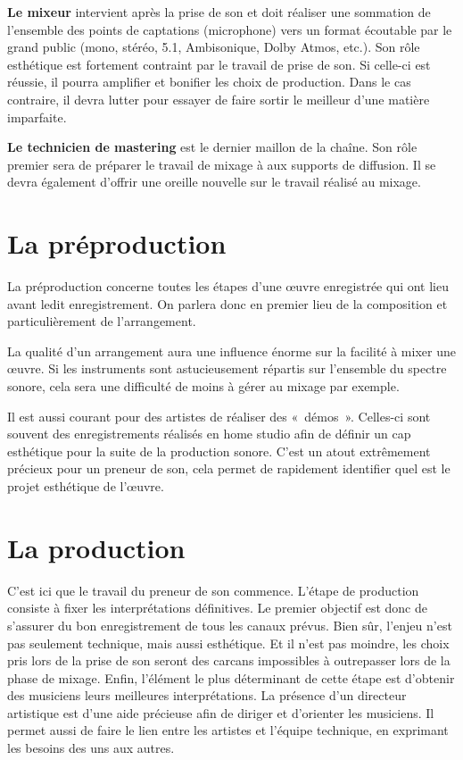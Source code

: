 \documentclass[
]{book}
\begin{document}
\textbf{Le mixeur} intervient après la prise de son et doit réaliser une sommation de l'ensemble des points de captations (microphone) vers un format écoutable par le grand public (mono, stéréo, 5.1, Ambisonique, Dolby Atmos, etc.). Son rôle esthétique est fortement contraint par le travail de prise de son. Si celle-ci est réussie, il pourra amplifier et bonifier les choix de production. Dans le cas contraire, il devra lutter pour essayer de faire sortir le meilleur d'une matière imparfaite.

\textbf{Le technicien de mastering} est le dernier maillon de la chaîne. Son rôle premier sera de préparer le travail de mixage à aux supports de diffusion. Il se devra également d'offrir une oreille nouvelle sur le travail réalisé au mixage.

\hypertarget{la-pruxe9production}{%
\section{La préproduction}\label{la-pruxe9production}}

La préproduction concerne toutes les étapes d'une œuvre enregistrée qui ont lieu avant ledit enregistrement. On parlera donc en premier lieu de la composition et particulièrement de l'arrangement.

La qualité d'un arrangement aura une influence énorme sur la facilité à mixer une œuvre. Si les instruments sont astucieusement répartis sur l'ensemble du spectre sonore, cela sera une difficulté de moins à gérer au mixage par exemple.

Il est aussi courant pour des artistes de réaliser des «~démos~». Celles-ci sont souvent des enregistrements réalisés en home studio afin de définir un cap esthétique pour la suite de la production sonore. C'est un atout extrêmement précieux pour un preneur de son, cela permet de rapidement identifier quel est le projet esthétique de l'œuvre.

\hypertarget{la-production}{%
\section{La production}\label{la-production}}

C'est ici que le travail du preneur de son commence. L'étape de production consiste à fixer les interprétations définitives. Le premier objectif est donc de s'assurer du bon enregistrement de tous les canaux prévus. Bien sûr, l'enjeu n'est pas seulement technique, mais aussi esthétique. Et il n'est pas moindre, les choix pris lors de la prise de son seront des carcans impossibles à outrepasser lors de la phase de mixage. Enfin, l'élément le plus déterminant de cette étape est d'obtenir des musiciens leurs meilleures interprétations. La présence d'un directeur artistique est d'une aide précieuse afin de diriger et d'orienter les musiciens. Il permet aussi de faire le lien entre les artistes et l'équipe technique, en exprimant les besoins des uns aux autres.
\end{document}
